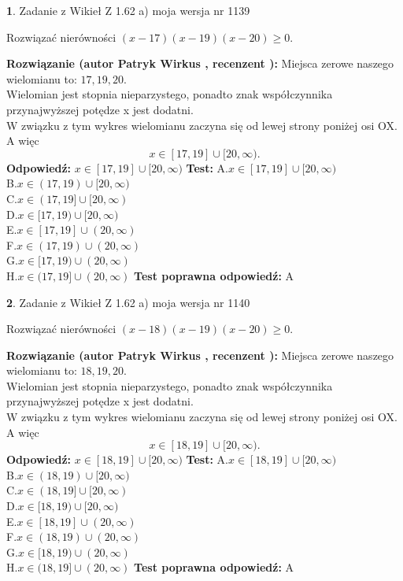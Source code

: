\documentclass[12pt, a4paper]{article}
\theoremstyle{definition} %
\newtheorem{zad}{}
\newcommand{\zadStart}[1]{\begin{zad}#1\newline}
\newcommand{\zadStop}{\end{zad}}
\newcommand{\rozwStart}[2]{\noindent \textbf{Rozwiązanie (autor #1 , recenzent #2): }\newline}
\newcommand{\rozwStop}{\newline}
\newcommand{\odpStart}{\noindent \textbf{Odpowiedź:}\newline}
\newcommand{\odpStop}{\newline}
\newcommand{\testStart}{\noindent \textbf{Test:}\newline}
\newcommand{\testStop}{\newline}
\newcommand{\kluczStart}{\noindent \textbf{Test poprawna odpowiedź:}\newline}
\newcommand{\kluczStop}{\newline}
\begin{document}
\zadStart{Zadanie z Wikieł Z 1.62 a) moja wersja nr 1139}

Rozwiązać nierówności $(x-17)(x-19)(x-20)\ge0$.
\zadStop
\rozwStart{Patryk Wirkus}{}
Miejsca zerowe naszego wielomianu to: $17, 19, 20$.\\
Wielomian jest stopnia nieparzystego, ponadto znak współczynnika przy\linebreak najwyższej potędze x jest dodatni.\\ W związku z tym wykres wielomianu zaczyna się od lewej strony poniżej osi OX. A więc $$x \in [17,19] \cup [20,\infty).$$
\rozwStop
\odpStart
$x \in [17,19] \cup [20,\infty)$
\odpStop
\testStart
A.$x \in [17,19] \cup [20,\infty)$\\
B.$x \in (17,19) \cup [20,\infty)$\\
C.$x \in (17,19] \cup [20,\infty)$\\
D.$x \in [17,19) \cup [20,\infty)$\\
E.$x \in [17,19] \cup (20,\infty)$\\
F.$x \in (17,19) \cup (20,\infty)$\\
G.$x \in [17,19) \cup (20,\infty)$\\
H.$x \in (17,19] \cup (20,\infty)$
\testStop
\kluczStart
A
\kluczStop



\zadStart{Zadanie z Wikieł Z 1.62 a) moja wersja nr 1140}

Rozwiązać nierówności $(x-18)(x-19)(x-20)\ge0$.
\zadStop
\rozwStart{Patryk Wirkus}{}
Miejsca zerowe naszego wielomianu to: $18, 19, 20$.\\
Wielomian jest stopnia nieparzystego, ponadto znak współczynnika przy\linebreak najwyższej potędze x jest dodatni.\\ W związku z tym wykres wielomianu zaczyna się od lewej strony poniżej osi OX. A więc $$x \in [18,19] \cup [20,\infty).$$
\rozwStop
\odpStart
$x \in [18,19] \cup [20,\infty)$
\odpStop
\testStart
A.$x \in [18,19] \cup [20,\infty)$\\
B.$x \in (18,19) \cup [20,\infty)$\\
C.$x \in (18,19] \cup [20,\infty)$\\
D.$x \in [18,19) \cup [20,\infty)$\\
E.$x \in [18,19] \cup (20,\infty)$\\
F.$x \in (18,19) \cup (20,\infty)$\\
G.$x \in [18,19) \cup (20,\infty)$\\
H.$x \in (18,19] \cup (20,\infty)$
\testStop
\kluczStart
A
\kluczStop
\end{document}

